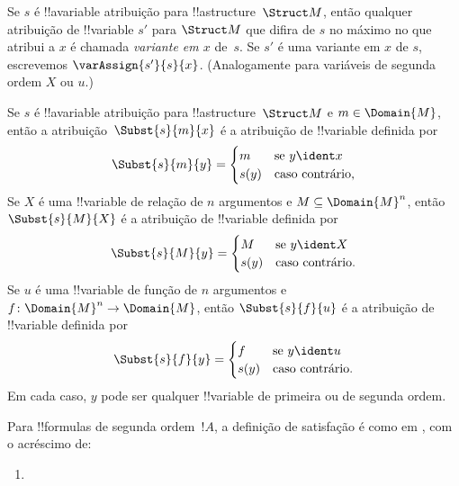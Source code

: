 \documentclass[../../../include/open-logic-section]{subfiles}
\begin{document}
\begin{defn}[Variante em $x$]
Se $s$ é !!a{variable} atribuição para !!a{structure}~$\Struct M$, então
qualquer atribuição de !!{variable} $s'$ para $\Struct M$ que difira de $s$
no máximo no que atribui a $x$ é chamada \emph{variante em $x$} de~$s$. Se
$s'$ é uma variante em $x$ de $s$, escrevemos $\varAssign{s'}{s}{x}$.
(Analogamente para variáveis de segunda ordem $X$ ou $u$.)
\end{defn}

\begin{defn}
  Se $s$ é !!a{variable} atribuição para !!a{structure}~$\Struct M$ e
  $m \in \Domain{M}$, então a atribuição~$\Subst{s}{m}{x}$ é a atribuição
  de !!{variable} definida por
  \[\Subst{s}{m}{y} = \begin{cases}
    m & \text{se } y \ident x\\
    s(y) & \text{caso contrário},
  \end{cases}\]
  Se $X$ é uma !!{variable} de relação de $n$ argumentos e $M \subseteq
  \Domain{M}^n$, então $\Subst{s}{M}{X}$ é a atribuição de !!{variable}
  definida por
  \[\Subst{s}{M}{y} = \begin{cases}
    M & \text{se } y \ident X\\
    s(y) & \text{caso contrário}. 
  \end{cases}\]
  Se $u$ é uma !!{variable} de função de $n$ argumentos e
  $f\colon \Domain{M}^n \to \Domain{M}$, então $\Subst{s}{f}{u}$ é a
  atribuição de !!{variable} definida por
  \[\Subst{s}{f}{y} = \begin{cases}
    f & \text{se } y \ident u\\
    s(y) & \text{caso contrário}.
  \end{cases}\]
  Em cada caso, $y$ pode ser qualquer !!{variable} de primeira ou de
  segunda ordem.
\end{defn}

\begin{defn}[Satisfação]
Para !!{formula}s de segunda ordem~$!A$, a definição de satisfação é como
em , com o acréscimo de:
\begin{enumerate}
\item {}



\end{enumerate}
\end{defn}
\end{document}
